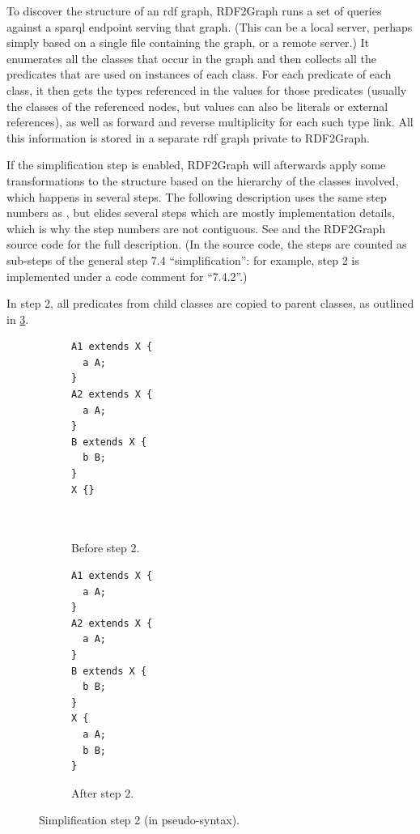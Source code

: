 To discover the structure of an \gls{rdf} graph,
RDF2Graph runs a set of queries against a \gls{sparql} endpoint serving that graph.
(This can be a local server, perhaps simply based on a single file containing the graph,
or a remote server.)
It enumerates all the classes that occur in the graph
and then collects all the predicates that are used on instances of each class.
For each predicate of each class,
it then gets the types referenced in the values for those predicates
(usually the classes of the referenced nodes,
but values can also be literals or external references),
as well as forward and reverse multiplicity for each such type link.
All this information is stored in a separate \gls{rdf} graph private to RDF2Graph.

If the simplification step is enabled,
RDF2Graph will afterwards apply some transformations to the structure
based on the hierarchy of the classes involved,
which happens in several steps.
The following description uses the same step numbers as \cite{vanDam2015},
but elides several steps which are mostly implementation details,
which is why the step numbers are not contiguous.
See \cite{vanDam2015} and the RDF2Graph source code for the full description.
(In the source code, the steps are counted as sub-steps of the general step 7.4 “simplification”:
for example, step 2 is implemented under a code comment for “7.4.2”.)

In step 2, all predicates from child classes are copied to parent classes,
as outlined in \cref{fig:simplify-7.4.2}.

\begin{figure}[ht]
  \begin{subfigure}[t]{0.45\textwidth}
    \begin{lstlisting}[showlines=true]
A1 extends X {
  a A;
}
A2 extends X {
  a A;
}
B extends X {
  b B;
}
X {}



    \end{lstlisting}
    \caption{Before step 2.}
    \label{fig:simplify-7.4.2-before}
  \end{subfigure}
  \begin{subfigure}[t]{0.45\textwidth}
    \begin{lstlisting}
A1 extends X {
  a A;
}
A2 extends X {
  a A;
}
B extends X {
  b B;
}
X {
  a A;
  b B;
}
    \end{lstlisting}
    \caption{After step 2.}
    \label{fig:simplify-7.4.2-after}
  \end{subfigure}
  \caption[Simplification step 2.]{Simplification step 2 (in pseudo-syntax).}
  \label{fig:simplify-7.4.2}
\end{figure}

